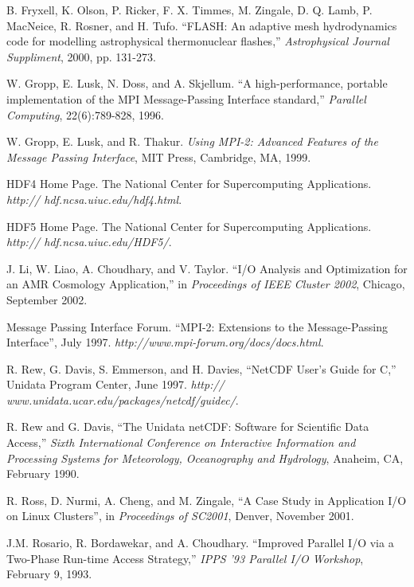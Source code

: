 \documentclass[10pt,twocolumn]{article}          %
\begin{document}
\begin{thebibliography}{99}

\small \setlength{\parskip}{-0.3pc}

B. Fryxell, K. Olson, P. Ricker, F. X. Timmes, M. Zingale, D. Q. Lamb, P. MacNeice, R. Rosner, and
H. Tufo. ``FLASH: An adaptive mesh hydrodynamics code for modelling astrophysical thermonuclear
flashes,'' {\em Astrophysical Journal Suppliment}, 2000, pp. 131-273.

W. Gropp, E. Lusk, N. Doss, and A. Skjellum. ``A high-performance, portable implementation of the
MPI Message-Passing Interface standard,'' {\em Parallel Computing}, 22(6):789-828, 1996.

W. Gropp, E. Lusk, and R. Thakur. {\em Using MPI-2: Advanced Features of the Message Passing
Interface}, MIT Press, Cambridge, MA, 1999.

HDF4 Home Page. The National Center for Supercomputing Applications. {\em http://
hdf.ncsa.uiuc.edu/hdf4.html}.

HDF5 Home Page. The National Center for Supercomputing Applications. {\em http://
hdf.ncsa.uiuc.edu/HDF5/}.

J. Li, W. Liao, A. Choudhary, and V. Taylor. ``I/O Analysis and
Optimization for an AMR Cosmology Application,'' in {\em
Proceedings of IEEE Cluster 2002}, Chicago, September 2002.

Message Passing Interface Forum. ``MPI-2: Extensions to the Message-Passing Interface'', July 1997.
{\em http://www.mpi-forum.org/docs/docs.html}.

R. Rew, G. Davis, S. Emmerson, and H. Davies, ``NetCDF User's Guide for C,'' Unidata Program
Center, June 1997. {\em http:// www.unidata.ucar.edu/packages/netcdf/guidec/}.

R. Rew and G. Davis, ``The Unidata netCDF: Software for Scientific
Data Access,'' {\em Sixth International Conference on Interactive
Information and Processing Systems for Meteorology, Oceanography
and Hydrology}, Anaheim, CA, February 1990.

R. Ross, D. Nurmi, A. Cheng, and M. Zingale, ``A Case Study in
Application I/O on Linux Clusters'', in {\em Proceedings of
SC2001}, Denver,  November 2001.

J.M. Rosario, R. Bordawekar, and A. Choudhary. ``Improved Parallel
I/O via a Two-Phase Run-time Access Strategy,'' {\em IPPS '93
Parallel I/O Workshop}, February 9, 1993.


\end{thebibliography}
\end{document}
